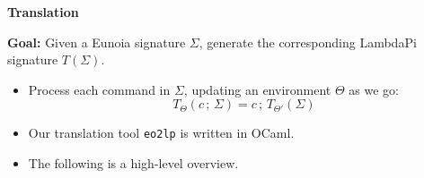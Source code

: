 \documentclass[lualatex, compress, 12pt, handout]{beamer}
\begin{document}
\begin{frame}[standout]
	\centering\Huge
	\textbf{Translation}
\end{frame}

\newcommand{\tra}[1]{\llbracket\,#1\,\rrbracket}
\newcommand{\ki}[1]{{\tra{#1}}_{\mbf{ki}}}
\newcommand{\ty}[1]{{\tra{#1}}_{\mbf{ty}}}
\newcommand{\tm}[1]{{\tra{#1}}_{\mbf{tm}}}
\newcommand{\rawapp}[2]{\paren{\mtt{\_}\ {#1}\ {#2}}}

\begin{frame}
	\textbf{Goal:}
	Given a Eunoia signature $Σ$,
	generate the corresponding LambdaPi signature $T(Σ)$.

	\begin{itemize}
		\item<+-> Process each command in $Σ$,
		      updating an environment $Θ$ as we go:
		      $$T_{Θ}(c\,{;}\,Σ) = c\,{;}\,T_{Θ'}(Σ)$$

		\item<+-> Our translation tool \texttt{eo2lp} is written in OCaml.
		\item<+-> The following is a high-level overview.
	\end{itemize}
\end{frame}

\end{document}
